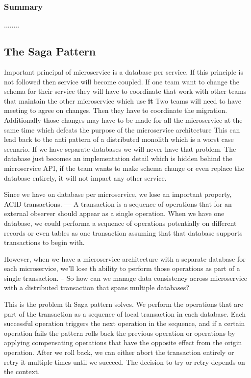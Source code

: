 \documentclass[a4paper, 11pt]{book}
\begin{document}
    \subsubsection{Summary}
    ........

    \subsection{The Saga Pattern}
    Important principal of microservice is a database per service.
    If this principle is not followed then service will become coupled.
    If one team want to change the schema for their service they will have to coordinate that work with other teams that maintain the other microservice which use \textbf{it}
    Two teams will need to have meeting to agree on changes.
    Then they have to coordinate the migration.
    Additionally those changes may have to be made for all the microservice at the same time which defeats the purpose of the microservice architecture
    This can lead back to the anti pattern of a distributed monolith which is a worst case scenario.
    If we have separate databases we will never have that problem.
    The database just becomes an implementation detail which is hidden behind the microservice API, if the team wants to make schema change or even replace the database entirely, it will not impact any other service.

    Since we have on database per microservice, we lose an important property, ACID transactions.
    --- A transaction is a sequence of operations that for an external observer should appear as a single operation.
    When we have one database, we could performa a sequence of operations potentially on different records or even tables as one transaction assuming that that database supports transactions to begin with.

    However, when we have a microservice architecture with a separate database for each microservice, we'll lose th ability to perform those operations as part of a single transaction.
    -- So how can we manage data consistency across microservice with a distributed transaction that spans multiple databases?

    This is the problem th Saga pattern solves.
    We perform the operations that are part of the transaction as a sequence of local transaction in each database.
    Each successful operation triggers the next operation in the sequence, and if a certain operation fails the pattern rolls back the previous operation or operations by applying compensating operations that have the opposite effect from the origin operation.
    After we roll back, we can either abort the transaction entirely or retry it multiple times until we succeed.
    The decision to try or retry depends on the context.
\end{document}
